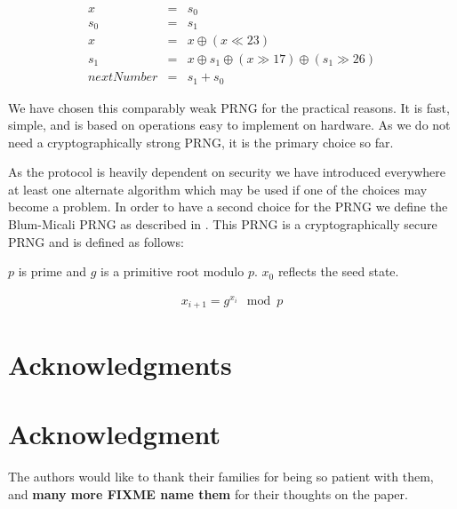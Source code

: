 \documentclass[9pt,journal,compsoc]{IEEEtran}
\begin{document}
\begin{eqnarray}
x & = & s_0\\
s_0 & = & s_1\\
x & = & x \oplus ( x \ll 23 )\\
s_1 & = & x \oplus s_1 \oplus ( x \gg 17 ) \oplus (s_1 \gg 26 )\\
nextNumber & = & s_1+s_0
\end{eqnarray}

We have chosen this comparably weak PRNG for the practical reasons. It is fast, simple, and is based on operations easy to implement on hardware. As we do not need a cryptographically strong PRNG, it is the primary choice so far. 

As the protocol is heavily dependent on security we have introduced everywhere at least one alternate algorithm which may be used if one of the choices may become a problem. In order to have a second choice for the PRNG we define the Blum-Micali PRNG as described in \cite{blum1984generate}. This PRNG is a cryptographically secure PRNG and is defined as follows:

$p$ is prime and $g$ is a primitive root modulo $p$. $x_0$ reflects the seed state.

\begin{eqnarray}
x_{i+1}=g^{x_i}\mod p
\end{eqnarray}



\ifCLASSOPTIONcompsoc
  \section*{Acknowledgments}
\else
  \section*{Acknowledgment}
\fi


The authors would like to thank their families for being so patient with them, and \textbf{many more FIXME name them} for their thoughts on the paper.


\ifCLASSOPTIONcaptionsoff
  \newpage
\fi
\end{document}
